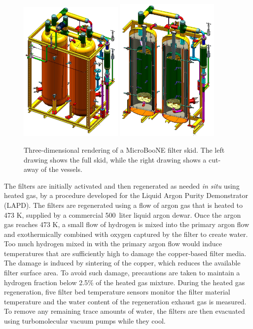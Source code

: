 \begin{figure}
\centering 
\includegraphics[width=0.45\textwidth]{figures/cryo-filter-skid}
\includegraphics[width=0.45\textwidth]{figures/cryo-filter-skid-cutaway}
\caption{Three-dimensional rendering of a MicroBooNE filter skid.  The left drawing shows the full skid, while the right drawing shows a cut-away of the vessels.}
\label{filters}
\end{figure}


The filters are initially activated and then regenerated as needed {\it in situ} using heated gas, by a procedure developed for the Liquid Argon Purity Demonstrator (LAPD).  The filters are regenerated using a flow of argon gas that is heated to 473 K, supplied by a commercial 500~liter liquid argon dewar.   Once the argon gas reaches 473 K, a small flow of hydrogen is mixed into the primary argon flow and exothermically combined with oxygen captured by the filter to create water.  Too much hydrogen mixed in with the primary argon flow would induce temperatures that are sufficiently high to damage the copper-based filter media.  The damage is induced by sintering of the copper, which reduces the available filter surface area.  To avoid such damage, precautions are taken to maintain a hydrogen fraction below 2.5\% of the heated gas mixture.  During the heated gas regeneration, five filter bed temperature sensors monitor the filter material temperature and the water content of the regeneration exhaust gas is measured.  To remove any remaining trace amounts of water, the filters are then evacuated using turbomolecular vacuum pumps while they cool. 

